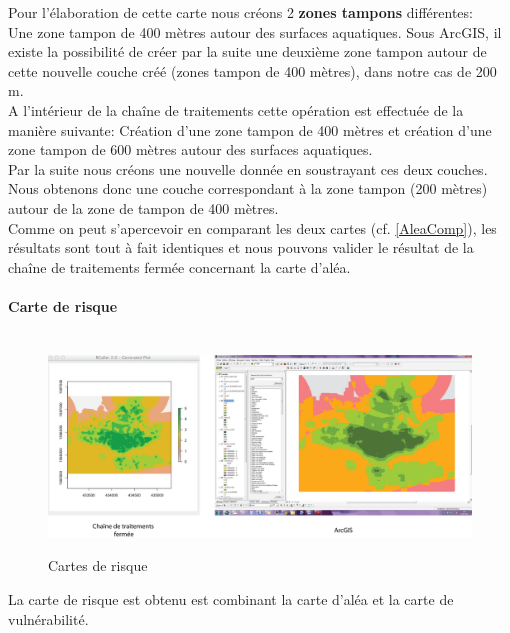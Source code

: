 Pour l'élaboration de cette carte nous créons 2\textbf{ zones tampons} différentes: \\

Une zone tampon de 400 mètres autour des surfaces aquatiques. Sous ArcGIS, il existe la possibilité de créer par la suite une deuxième zone tampon autour de cette nouvelle couche créé (zones tampon de 400 mètres), dans notre cas de 200 m.\\
A l'intérieur de la chaîne de traitements cette opération est effectuée de la manière suivante: Création d'une zone tampon de 400 mètres et création d'une zone tampon de 600 mètres autour des surfaces aquatiques. \\
Par la suite nous créons une nouvelle donnée en soustrayant ces deux couches. Nous obtenons donc une couche correspondant à la zone tampon (200 mètres) autour de la zone de tampon de 400 mètres. \\
Comme on peut s'apercevoir en comparant les deux cartes (cf. \ref{AleaComp}), les résultats sont tout à fait identiques et nous pouvons valider le résultat de la chaîne de traitements fermée concernant la carte d'aléa.

\paragraph{Carte de risque\\\\}

\begin{center}
\begin{figure}[h] \centering
\includegraphics[width=14cm]{RisqueComp}\\
\caption{\label{RisqueComp} Cartes de risque}
\end{figure}
\end{center}

La carte de risque est obtenu est combinant la carte d'aléa et la carte de vulnérabilité. \\

